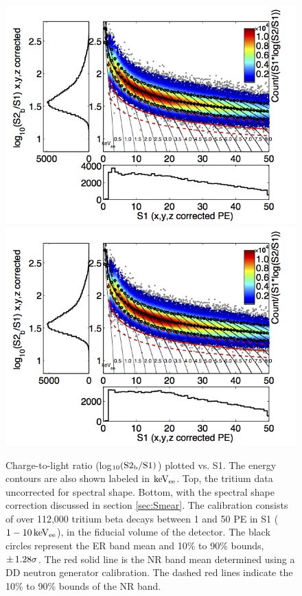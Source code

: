 \renewcommand{\baselinestretch}{1}
\small\normalsize
\begin{figure}[p!]\centering
\includegraphics[width=120mm]{Chapter_T/Figures/ER_Band/CH3T_fid_50_rawSpec.png}
\includegraphics[width=120mm]{Chapter_T/Figures/ER_Band/CH3T_fid_50_proj.png}
\caption{Charge-to-light ratio (log$\rm _{10}(S2_b/S1)$) plotted vs. S1. The energy contours are also shown labeled in $\rm keV_{ee}$. Top, the tritium data uncorrected for spectral shape. Bottom, with the spectral shape correction discussed in section \ref{sec:Smear}. The calibration consists of over 112,000 tritium beta decays between 1 and 50 PE in S1 ($\rm1-10 \, keV_{ee}$), in the fiducial volume of the detector. The black circles represent the ER band mean and 10\% to 90\% bounds, $\rm \pm \,1.28\sigma$. The red solid line is the NR band mean determined using a DD neutron generator calibration. The dashed red lines indicate the 10\% to 90\% bounds of the NR band.}
\label{fig:Band}
\end{figure}
\renewcommand{\baselinestretch}{2}
\small\normalsize
\newpage

